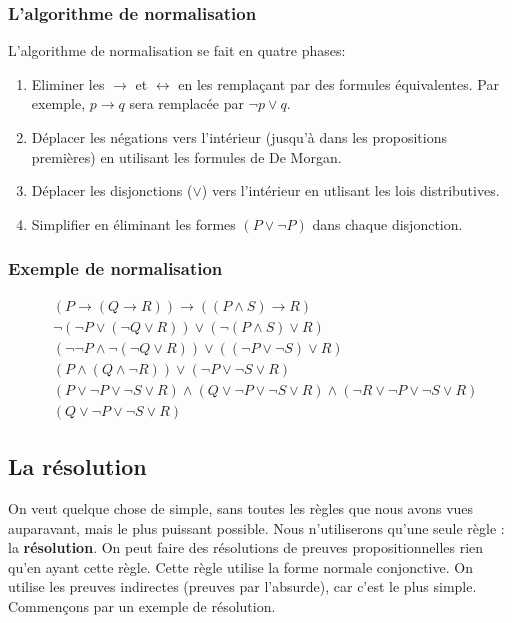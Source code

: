 \subsubsection{L'algorithme de normalisation}

L'algorithme de normalisation se fait en quatre phases:
\begin{enumerate}
\item Eliminer les $\rightarrow$ et $\leftrightarrow$ en les remplaçant par des formules équivalentes.  Par exemple, $p \rightarrow q$ sera remplacée par $\lnot p \lor q$.
\item Déplacer les négations vers l'intérieur (jusqu'à dans les propositions premières) en utilisant les formules de De Morgan.
\item Déplacer les disjonctions ($\lor$) vers l'intérieur en utlisant les lois distributives.
\item Simplifier en éliminant les formes $(P \lor \lnot P)$ dans chaque disjonction.
\end{enumerate}

\subsubsection{Exemple de normalisation}

\begin{align*}
& (P \rightarrow (Q \rightarrow R)) \rightarrow ((P \land S) \rightarrow R) \\
& \lnot (\lnot P \lor (\lnot Q \lor R)) \lor (\lnot (P \land S) \lor R) \\
& ( \lnot \lnot P \land \lnot (\lnot Q \lor R)) \lor ((\lnot P \lor \lnot S) \lor R) \\
& (P \land (Q \land \lnot R)) \lor ( \lnot P \lor \lnot S \lor R) \\
& (P \lor \lnot P \lor \lnot S \lor R) \land ( Q \lor \lnot P \lor \lnot S \lor R) \land (\lnot R \lor \lnot P \lor \lnot S \lor R) \\
& (Q \lor \lnot P \lor \lnot S \lor R) 
\end{align*}

\subsection{La résolution}

On veut quelque chose de simple, sans toutes les règles que nous avons vues auparavant, mais le plus puissant possible. Nous n'utiliserons qu'une seule règle : la \textbf{résolution}. On peut faire des résolutions de preuves propositionnelles rien qu'en ayant cette règle. Cette règle utilise la forme normale conjonctive. 
On utilise les preuves indirectes (preuves par l'absurde), car c'est le plus simple.
\\
Commençons par un exemple de résolution.

